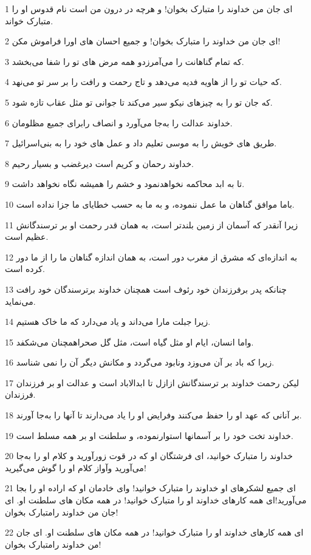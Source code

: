 \par 1 ای جان من خداوند را متبارک بخوان! و هرچه در درون من است نام قدوس او را متبارک خواند.
\par 2 ‌ای جان من خداوند را متبارک بخوان! و جمیع احسان های اورا فراموش مکن!
\par 3 که تمام گناهانت را می‌آمرزدو همه مرض های تو را شفا می‌بخشد.
\par 4 که حیات تو را از هاویه فدیه می‌دهد و تاج رحمت و رافت را بر سر تو می‌نهد.
\par 5 که جان تو را به چیزهای نیکو سیر می‌کند تا جوانی تو مثل عقاب تازه شود.
\par 6 خداوند عدالت را به‌جا می‌آورد و انصاف رابرای جمیع مظلومان.
\par 7 طریق های خویش را به موسی تعلیم داد و عمل های خود را به بنی‌اسرائیل.
\par 8 خداوند رحمان و کریم است دیرغضب و بسیار رحیم.
\par 9 تا به ابد محاکمه نخواهدنمود و خشم را همیشه نگاه نخواهد داشت.
\par 10 باما موافق گناهان ما عمل ننموده، و به ما به حسب خطایای ما جزا نداده است.
\par 11 زیرا آنقدر که آسمان از زمین بلندتر است، به همان قدر رحمت او بر ترسندگانش عظیم است.
\par 12 به اندازه‌ای که مشرق از مغرب دور است، به همان اندازه گناهان ما را از ما دور کرده است.
\par 13 چنانکه پدر برفرزندان خود رئوف است همچنان خداوند برترسندگان خود رافت می‌نماید.
\par 14 زیرا جبلت مارا می‌داند و یاد می‌دارد که ما خاک هستیم.
\par 15 واما انسان، ایام او مثل گیاه است، مثل گل صحراهمچنان می‌شکفد.
\par 16 زیرا که باد بر آن می‌وزد ونابود می‌گردد و مکانش دیگر آن را نمی شناسد.
\par 17 لیکن رحمت خداوند بر ترسندگانش ازازل تا ابدالاباد است و عدالت او بر فرزندان فرزندان.
\par 18 بر آنانی که عهد او را حفظ می‌کنند وفرایض او را یاد می‌دارند تا آنها را به‌جا آورند.
\par 19 خداوند تخت خود را بر آسمانها استوارنموده، و سلطنت او بر همه مسلط است.
\par 20 خداوند را متبارک خوانید، ای فرشتگان او که در قوت زورآورید و کلام او را به‌جا می‌آورید وآواز کلام او را گوش می‌گیرید!
\par 21 ‌ای جمیع لشکرهای او خداوند را متبارک خوانید! و‌ای خادمان او که اراده او را بجا می‌آورید!‌ای همه کارهای خداوند او را متبارک خوانید! در همه مکان های سلطنت او. ای جان من خداوند رامتبارک بخوان!
\par 22 ‌ای همه کارهای خداوند او را متبارک خوانید! در همه مکان های سلطنت او. ای جان من خداوند رامتبارک بخوان!
 
